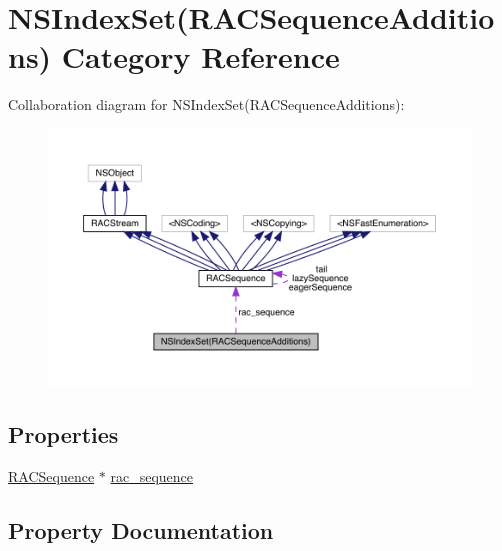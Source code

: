 \hypertarget{category_n_s_index_set_07_r_a_c_sequence_additions_08}{}\section{N\+S\+Index\+Set(R\+A\+C\+Sequence\+Additions) Category Reference}
\label{category_n_s_index_set_07_r_a_c_sequence_additions_08}


Collaboration diagram for N\+S\+Index\+Set(R\+A\+C\+Sequence\+Additions)\+:\nopagebreak
\begin{figure}[H]
\begin{center}
\leavevmode
\includegraphics[width=350pt]{category_n_s_index_set_07_r_a_c_sequence_additions_08__coll__graph}
\end{center}
\end{figure}
\subsection*{Properties}
\begin{DoxyCompactItemize}
\item 
\mbox{\hyperlink{interface_r_a_c_sequence}{R\+A\+C\+Sequence}} $\ast$ \mbox{\hyperlink{category_n_s_index_set_07_r_a_c_sequence_additions_08_a0a3346da5a0230dee1390f662e997421}{rac\+\_\+sequence}}
\end{DoxyCompactItemize}


\subsection{Property Documentation}
\mbox{\label{category_n_s_index_set_07_r_a_c_sequence_additions_08_a0a3346da5a0230dee1390f662e997421}} 
